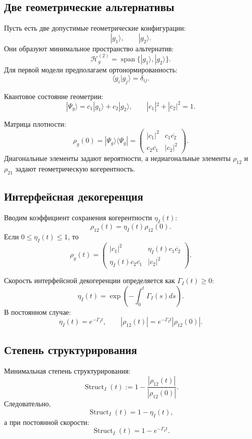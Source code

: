\documentclass[12pt,a4paper]{article}
\DeclareMathOperator{\Struct}{Struct}
\newcommand{\Hilb}{\mathcal H}
\begin{document}
\subsection{Две геометрические альтернативы}

Пусть есть две допустимые геометрические конфигурации:
\[
|g_1\rangle,
\qquad
|g_2\rangle.
\]
Они образуют минимальное пространство альтернатив:
\[
\Hilb_g^{(2)}=\operatorname{span}\{|g_1\rangle,|g_2\rangle\}.
\]
Для первой модели предполагаем ортонормированность:
\[
\langle g_i|g_j\rangle=\delta_{ij}.
\]

Квантовое состояние геометрии:
\[
|\Psi_g\rangle=c_1|g_1\rangle+c_2|g_2\rangle,
\qquad
|c_1|^2+|c_2|^2=1.
\]

Матрица плотности:
\[
\rho_g(0)=|\Psi_g\rangle\langle\Psi_g|
=
\begin{pmatrix}
|c_1|^2 & c_1\overline{c_2}\\
c_2\overline{c_1} & |c_2|^2
\end{pmatrix}.
\]
Диагональные элементы задают вероятности, а недиагональные элементы \(\rho_{12}\) и \(\rho_{21}\) задают геометрическую когерентность.

\subsection{Интерфейсная декогеренция}

Вводим коэффициент сохранения когерентности \(\eta_I(t)\):
\[
\rho_{12}(t)=\eta_I(t)\rho_{12}(0).
\]
Если \(0\leq\eta_I(t)\leq1\), то
\[
\rho_g(t)=
\begin{pmatrix}
|c_1|^2 & \eta_I(t)c_1\overline{c_2}\\
\eta_I(t)c_2\overline{c_1} & |c_2|^2
\end{pmatrix}.
\]

Скорость интерфейсной декогеренции определяется как \(\Gamma_I(t)\geq0\):
\[
\eta_I(t)=\exp\left(-\int_0^t\Gamma_I(s)ds\right).
\]
В постоянном случае:
\[
\eta_I(t)=e^{-\Gamma_I t},
\qquad
|\rho_{12}(t)|=e^{-\Gamma_I t}|\rho_{12}(0)|.
\]

\subsection{Степень структурирования}

Минимальная степень структурирования:
\[
\Struct_I(t):=1-\frac{|\rho_{12}(t)|}{|\rho_{12}(0)|}.
\]
Следовательно,
\[
\Struct_I(t)=1-\eta_I(t),
\]
а при постоянной скорости:
\[
\boxed{
\Struct_I(t)=1-e^{-\Gamma_I t}.
}
\]
\end{document}
